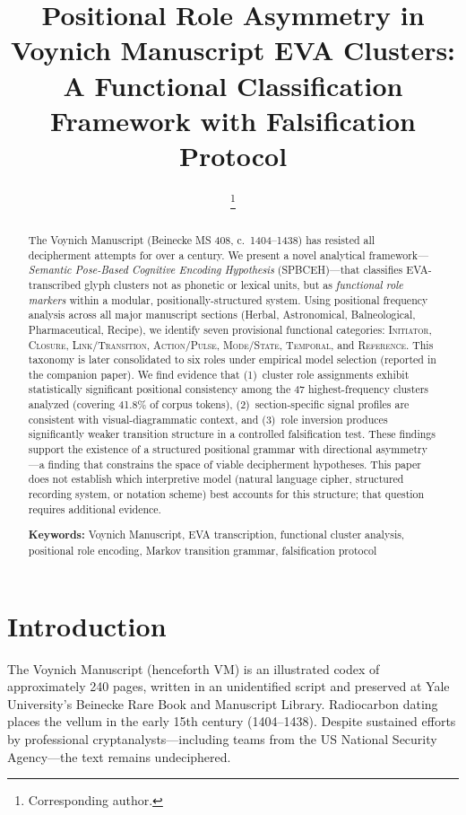 \documentclass[11pt,a4paper,twocolumn]{article}
\title{\textbf{Positional Role Asymmetry in Voynich Manuscript EVA Clusters:}\\[4pt]
\large A Functional Classification Framework with Falsification Protocol}
\author[1]{\AuthorName\thanks{Corresponding author. \AuthorURL}}
\affil[1]{\AuthorRole}
\date{\PaperSubtitle}
\begin{document}
\maketitle

\begin{abstract}
\noindent The Voynich Manuscript (Beinecke MS 408, c.\ 1404--1438) has resisted all decipherment attempts for over a century. We present a novel analytical framework---\textit{Semantic Pose-Based Cognitive Encoding Hypothesis} (SPBCEH)---that classifies EVA-transcribed glyph clusters not as phonetic or lexical units, but as \textit{functional role markers} within a modular, positionally-structured system. Using positional frequency analysis across all major manuscript sections (Herbal, Astronomical, Balneological, Pharmaceutical, Recipe), we identify seven provisional functional categories: \textsc{Initiator}, \textsc{Closure}, \textsc{Link/Transition}, \textsc{Action/Pulse}, \textsc{Mode/State}, \textsc{Temporal}, and \textsc{Reference}. This taxonomy is later consolidated to six roles under empirical model selection (reported in the companion paper). We find evidence that (1)~cluster role assignments exhibit statistically significant positional consistency among the 47 highest-frequency clusters analyzed (covering 41.8\% of corpus tokens), (2)~section-specific signal profiles are consistent with visual-diagrammatic context, and (3)~role inversion produces significantly weaker transition structure in a controlled falsification test. These findings support the existence of a structured positional grammar with directional asymmetry---a finding that constrains the space of viable decipherment hypotheses. This paper does not establish which interpretive model (natural language cipher, structured recording system, or notation scheme) best accounts for this structure; that question requires additional evidence.

\medskip
\noindent\textbf{Keywords:} Voynich Manuscript, EVA transcription, functional cluster analysis, positional role encoding, Markov transition grammar, falsification protocol
\end{abstract}

\section{Introduction}
\label{sec:intro}

The Voynich Manuscript (henceforth VM) is an illustrated codex of approximately 240 pages, written in an unidentified script and preserved at Yale University's Beinecke Rare Book and Manuscript Library. Radiocarbon dating places the vellum in the early 15th century (1404--1438). Despite sustained efforts by professional cryptanalysts---including teams from the US National Security Agency---the text remains undeciphered.
\end{document}
